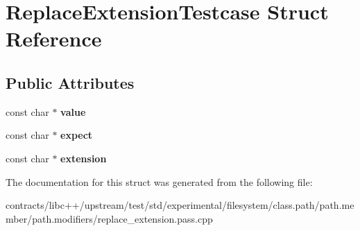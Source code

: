 \hypertarget{struct_replace_extension_testcase}{}\section{Replace\+Extension\+Testcase Struct Reference}
\label{struct_replace_extension_testcase}
\subsection*{Public Attributes}
\begin{DoxyCompactItemize}
\item 
\mbox{\label{struct_replace_extension_testcase_aaa9698b436f6d8656973e3afe2c0bc50}} 
const char $\ast$ {\bfseries value}
\item 
\mbox{\label{struct_replace_extension_testcase_a9b3d962291c40452535468fe6a58b70a}} 
const char $\ast$ {\bfseries expect}
\item 
\mbox{\label{struct_replace_extension_testcase_a2e110f154310dc7f3bcd4f9601321744}} 
const char $\ast$ {\bfseries extension}
\end{DoxyCompactItemize}


The documentation for this struct was generated from the following file\+:\begin{DoxyCompactItemize}
\item 
contracts/libc++/upstream/test/std/experimental/filesystem/class.\+path/path.\+member/path.\+modifiers/replace\+\_\+extension.\+pass.\+cpp\end{DoxyCompactItemize}
